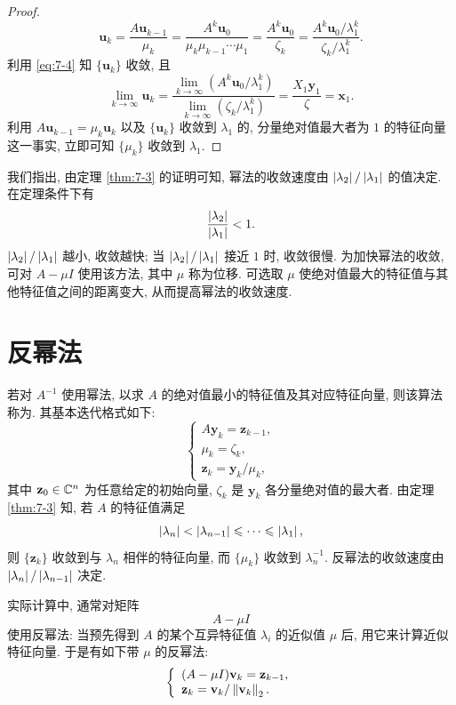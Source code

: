 \begin{proof}
\[
  \mathbf{u}_k=\frac{A\mathbf{u}_{k-1}}{\mu_k}
  =\frac{A^k\mathbf{u}_0}{\mu_k\mu_{k-1}\cdots\mu_1}
  =\frac{A^k\mathbf{u}_0}{\zeta_k}
  =\frac{A^k\mathbf{u}_0/\lambda_1^k}{\zeta_k/\lambda_1^k}.
\]
利用 \eqref{eq:7-4} 知 $\{\mathbf{u}_k\}$ 收敛, 且
\[
  \lim_{k\rightarrow\infty}\mathbf{u}_k
  =\frac{\lim_{k\rightarrow\infty}(A^k\mathbf{u}_0/\lambda_1^k)}
        {\lim_{k\rightarrow\infty}(\zeta_k/\lambda_1^k)}
  =\frac{X_1\mathbf{y}_1}{\zeta}=\mathbf{x}_1.
\]
利用 $A\mathbf{u}_{k-1}=\mu_k\mathbf{u}_k$ 以及 $\{\mathbf{u}_k\}$ 收敛到 $\lambda_1$ 的, 分量绝对值最大者为 $1$ 的特征向量这一事实, 立即可知 $\{\mu_k\}$ 收敛到 $\lambda_1$.
\end{proof}

我们指出, 由定理 \ref{thm:7-3} 的证明可知, 幂法的收敛速度由 $\left|\lambda_2\right|/\left|\lambda_1\right|$ 的值决定. 在定理条件下有
\[
  \frac{\left|\lambda_2\right|}{\left|\lambda_1\right|}<1.
\]
$\left|\lambda_2\right|/\left|\lambda_1\right|$ 越小, 收敛越快; 当 $\left|\lambda_2\right|/\left|\lambda_1\right|$ 接近 $1$ 时, 收敛很慢. 为加快幂法的收敛, 可对 $A-\mu I$ 使用该方法, 其中 $\mu$ 称为位移. 可选取 $\mu$ 使绝对值最大的特征值与其他特征值之间的距离变大, 从而提高幂法的收敛速度.

\section{反幂法}
\label{sec:7-3}

若对 $A^{-1}$ 使用幂法, 以求 $A$ 的绝对值最小的特征值及其对应特征向量, 则该算法称为. 其基本迭代格式如下:
\[
  \left\{
  \begin{array}{l}
    A\mathbf{y}_k=\mathbf{z}_{k-1},\\
    \mu_k=\zeta_k,\\
    \mathbf{z}_k=\mathbf{y}_k/\mu_k,
  \end{array}
  \right.
\]
其中 $\mathbf{z}_0\in\mathbb{C}^n$ 为任意给定的初始向量, $\zeta_k$ 是 $\mathbf{y}_k$ 各分量绝对值的最大者. 由定理 \ref{thm:7-3} 知, 若 $A$ 的特征值满足
\[
  \left|\lambda_n\right|<\left|\lambda_{n-1}\right|\leqslant\cdots\leqslant\left|\lambda_1\right|,
\]
则 $\{\mathbf{z}_k\}$ 收敛到与 $\lambda_n$ 相伴的特征向量, 而 $\{\mu_k\}$ 收敛到 $\lambda_n^{-1}$. 反幂法的收敛速度由 $\left|\lambda_n\right|/\left|\lambda_{n-1}\right|$ 决定.

实际计算中, 通常对矩阵
\[
  A-\mu I
\]
使用反幂法: 当预先得到 $A$ 的某个互异特征值 $\lambda_i$ 的近似值 $\mu$ 后, 用它来计算近似特征向量. 于是有如下带 $\mu$ 的反幂法:
\begin{equation}
  \left\{
  \begin{array}{l}
    (A-\mu I)\mathbf{v}_k=\mathbf{z}_{k-1},\\
    \mathbf{z}_k=\mathbf{v}_k/\left\|\mathbf{v}_k\right\|_2.
  \end{array}
  \right.
  \label{eq:7-5}
\end{equation}


